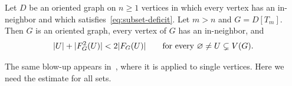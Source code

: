 \begin{lemma}\label{lem:blowup}
Let $D$ be an oriented graph on $n\ge1$ vertices in which every vertex has
an in-neighbor and which satisfies~\eqref{eq:subset-deficit}. Let $m>n$ and
$G=D[T_m]$. Then $G$ is an oriented graph, every vertex of $G$ has an
in-neighbor, and
\begin{equation}\label{eq:strict-concavity}
 \lvert U\rvert+\lvert F_G^2(U)\rvert<2\lvert F_G(U)\rvert\qquad\text{for every }\varnothing\ne U\subsetneq V(G).
\end{equation}
\end{lemma}

The same blow-up appears in~\cite[Theorem~4.3]{BrantnerBrockmanKaySnively2009},
where it is applied to single vertices. Here we need the estimate for all
sets.

